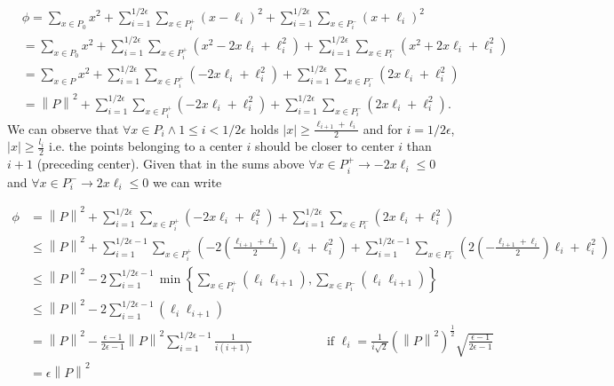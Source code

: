 \documentclass[a4paper]{article}
\newcommand{\norm}[1]{\left\lVert#1\right\rVert}
\begin{document}
\begin{enumerate}
    \begin{align*}
      &\phi =\sum_{x \in P_0} x^2 + \sum_{i = 1}^{1/2\epsilon}\sum_{x \in P_i^+}
      (x - \ell_i)^2 + \sum_{i = 1}^{1/2\epsilon}\sum_{x \in P_i^-} (x + \ell_i)^2 \\
      &=\sum_{x \in P_0} x^2 + \sum_{i = 1}^{1/2\epsilon}\sum_{x \in P_i^+} (x^2
      - 2x\ell_i + \ell_i^2)
      + \sum_{i = 1}^{1/2\epsilon}\sum_{x \in P_i^-} (x^2
      + 2x\ell_i + \ell_i^2)\\
      &=\sum_{x \in P} x^2 + \sum_{i = 1}^{1/2\epsilon}\sum_{x \in P_i^+} (
      - 2x\ell_i + \ell_i^2) + \sum_{i = 1}^{1/2\epsilon}\sum_{x \in P_i^-} (
      2x\ell_i + \ell_i^2)\\
      &=\norm{P}^2 + \sum_{i = 1}^{1/2\epsilon}\sum_{x \in P_i^+} (
      - 2x\ell_i + \ell_i^2) + \sum_{i = 1}^{1/2\epsilon}\sum_{x \in P_i^-} (
      2x\ell_i + \ell_i^2).
    \end{align*}
      We can observe that $\forall x \in P_i \land 1 \le i < 1/2\epsilon $
      holds $|x| \ge \frac{\ell_{i+1} + \ell_i }{2}$ and for $ i = 1/2\epsilon$,
      $|x|
      \ge \frac{l_i}{2}$ i.e. the points belonging to a center $i$ should be
      closer to center $i$ than $i + 1$ (preceding center). Given that in the
      sums above $\forall x \in P_i^+ \rightarrow -2x\ell_i \le 0$ and $\forall x
      \in P_i^- \rightarrow 2x\ell_i \le 0$ we can write

      \begin{align*}
        \phi &= \norm{P}^2 + \sum_{i = 1}^{1/2\epsilon}\sum_{x \in P_i^+} (
        - 2x\ell_i + \ell_i^2) + \sum_{i = 1}^{1/2\epsilon}\sum_{x \in P_i^-} (
        2x\ell_i + \ell_i^2) \\
        &\le \norm{P}^2 + \sum_{i = 1}^{1/2\epsilon - 1}\sum_{x \in P_i^+} (
        - 2 \left( \frac{\ell_{i+1} + \ell_i }{2} \right) \ell_i + \ell_i^2) +
        \sum_{i = 1}^{1/2\epsilon - 1 }\sum_{x \in P_i^-} (
        2 \left( - \frac{\ell_{i+1} + \ell_i }{2} \right) \ell_i + \ell_i^2) \\
        &\le \norm{P}^2 - 2\sum_{i = 1}^{1/2\epsilon - 1}
        \min \left\{ \sum_{x \in P_i^+} (\ell_i
        \ell_{i + 1}), \sum_{x \in P_i^-} (\ell_i
        \ell_{i + 1}) \right\}\\
        &\le \norm{P}^2 - 2\sum_{i = 1}^{1/2\epsilon - 1} (\ell_i \ell_{i + 1}) \\
        &=\norm{P}^2 - \frac{\epsilon - 1}{2\epsilon - 1}\norm{P}^2 \sum_{i = 1}^{1/2\epsilon - 1} \frac{1}{i (i
        + 1)} \qquad \qquad \qquad \text{if } \ell_i = \frac{1}{i \sqrt2}
        (\norm{P}^2)^{\frac{1}{2}} \sqrt{ \frac{\epsilon - 1}{2\epsilon - 1} } \\
        &= \epsilon \norm{P}^2
      \end{align*}
\end{enumerate}

    \iffalse
    \begin{figure}[!htbp]
    \begin{center}
    \texttt{[image: house.png]}
    \end{center}
    \caption{\textit{The house subgraph}}\label{house}
    \end{figure}
    \fi
\end{document}
